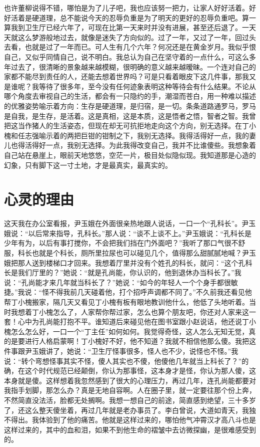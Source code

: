 \documentclass[12pt,oneside]{book}
\begin{document}
也许董柳说得不错，哪怕是为了儿子吧，我也应该努一把力，让家人好好活着。好好活着是硬道理，总不能说今天的忍辱负重是为了明天的更好的忍辱负重吧。算一算我到卫生厅已经六年了，可现在比第一天来时并没有进展，甚至还后退了。一天天就这么梦游般地过去，就像是迷失了方向似的。过了一年，又过了一年，回过头去看，也就是过了一年而已。可人生有几个六年？何况还是在黄金岁月。我似乎恨自己，又似乎同情自己，说不明白。我总认为自己在坚守着的一点什么，可这么多年过去了，很清晰的景象越来越模糊，很明确的意义越来越暧昧。一个连对自己的家都不能尽到责任的人，还能去想着世界吗？可是只看着眼皮下这几件事，那我又是谁呢？我等待了很多年，至今没有任何迹象表明这种等待会有什么结果。不论从哪个角度去审视自己的生活，都会有一只隐约的手，潮湿而苍白，用一种难以描述的优雅姿势喻示着方向：生存是硬道理，是归宿，是一切。条条道路通罗马，罗马是自我，是生存，是活着。这是真相，这是本质，这是悟者之悟，智者之智。我曾把这当作猪人的生活姿态，但现在却无可抗拒地走向这个方向，别无选择。在丁小槐和任志强喻示着的两把巨钳的钳制之下，我别无选择。我得活得好一点，我的妻儿也得活得好一点，我别无选择。为此我得改变自己，我并不比谁傻些。我想象着自己站在悬崖上，眼前天地悠悠，空茫一片，极目处似隐似现。我知道那是心造的幻象，只有脚下这一寸土地，才是最真实，最真实的。


\chapter{心灵的理由}

这天我在办公室看报，尹玉娥在外面很亲热地跟人说话，一口一个``孔科长''。尹玉娥说：``以后常来指导，孔科长。''那人说：``谈不上谈不上。''尹玉娥说：``孔科长是少年有为，以后有事打搅你，不会把我们挡在门外面吧？''我听了那口气很不舒服，科长也就是个科长，厕所里拉尿也可以碰见几个，值得那么甜腻腻地喊？尹玉娥把那人送到楼梯口才回来。我想着厅里并没有个姓孔的科长，就问：``这个孔科长是我们厅里的？''她说：``就是孔尚能，你认识的，他到退休办当科长了。''我说：``孔尚能才来几年就当科长了？''她说：``如今的年轻人一个个身手都很敏捷。''我说：``怪不得我前几天碰着他，打个招呼声调都不同了。''不久前我还看见他帮丁小槐搬家，隔几天又看见丁小槐有板有眼地教训他什么，他低了头地听着。当时我想着丁小槐怎么了，人家帮你帮过家，怎么也算个朋友吧，你还对人家来这一套！心中为孔尚能打抱不平。谁知道后来碰见他在图书室跟小赵说话，他还说丁小槐怎么怎么好，一口一个``丁主任''如何如何。我觉得奇怪，这人怎么无知无觉，真的是要进行人格启蒙啊！丁小槐好不好，他不知道？我就不相信他那么傻。我把这件事跟尹玉娥讲了，她说：``卫生厅怪事很多，怪人也不少，说怪也不怪。''我说：``转个弯想怪事其实不怪，傻人其实也不傻，他傻他几年就当上科长了？''的确，在这个时代规范已经颠倒，你认为那事怪，这本身才是怪，你认为那人傻，这本身就是傻。这样想着我忽然感到了很大的心理压力，再过几年，连孔尚能都要对我指手划脚，那怎么办？真是无地自容啊。人在圈子里，就一定要往那个份上奔，不然简直没法活，脸都无处搁啊。我想一想自己的前途，简直感到绝望，三十多岁了，还这么整天傻坐着，再过几年就是老办事员了。李白曾说，大道如青天，我独不得出。我体验到了他的痛苦。他就是这样过来的，哪怕他气冲霄汉才高八斗也是这样过来的，其中的血和泪，如果不到他生命的褶皱中去访微探幽，是很难感受到的。
\end{document}
